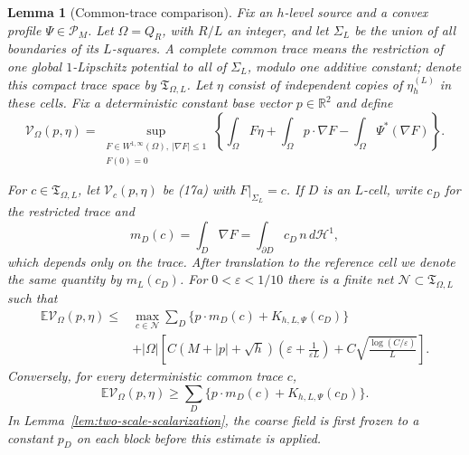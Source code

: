 \documentclass{aomart}
\newtheorem{lemma}[theorem]{Lemma}
\theoremstyle{definition}
\newcommand{\1}{\mathbf 1}
\begin{document}
\begin{lemma}[Common-trace comparison]\label{lem:finite-trace-net}
Fix an $h$-level source and a convex profile $\Psi\in\mathscr P_ M$.
Let $\Omega=Q_ R$, with $R/L$ an integer, and let $\Sigma_ L$ be
the union of all boundaries of its $L$-squares.  A complete common
trace means the restriction of one global $1$-Lipschitz potential to
all of $\Sigma_ L$, modulo one additive constant; denote this compact
trace space by $\mathfrak T_ {\Omega,L}$.  Let $\eta$ consist of independent
copies of $\eta_h^{(L)}$ in these cells.  Fix a deterministic constant
base vector $p\in\mathbb R^2$ and define
\begin{equation}
\mathcal V_ {\Omega}(p,\eta)=
\sup_ {\substack{F\in W^{1,\infty}(\Omega),\ |\nabla F|\leq1\\F(0)=0}}
\left\{\int_ \Omega F\eta+\int_ \Omega p\cdot\nabla F
-\int_ \Omega\Psi^*(\nabla F)\right\}.
\tag{17a}
\end{equation}

For $c\in\mathfrak T_ {\Omega,L}$, let
$\mathcal V_ c(p,\eta)$ be (17a) with $F|_ {\Sigma_ L}=c$.
If $D$ is an $L$-cell, write $c_ D$ for
the restricted trace and
\begin{equation}
m_ D(c)=\int_ D\nabla F
=\int_ {\partial D}c_ D\,n\,d\mathcal H^1,
\tag{17b}
\end{equation}
which depends only on the trace.  After translation to the reference
cell we denote the same quantity by $m_ L(c_ D)$.  For
$0<\varepsilon<1/10$ there is
a finite net $\mathcal N\subset\mathfrak T_ {\Omega,L}$ such that
\begin{equation}
\begin{split}
\mathbb E\mathcal V_ \Omega(p,\eta)
\leq{}&\max_ {c\in\mathcal N}
\sum_ D\{p\cdot m_ D(c)+K_ {h,L,\Psi}(c_ D)\}\\
&+|\Omega|\left[
C(M+|p|+\sqrt h)\left(\varepsilon+\frac1{\varepsilon L}\right)
+C\sqrt{\frac{\log(C/\varepsilon)}L}\right].                   
\end{split}
\tag{17}
\end{equation}
Conversely, for every deterministic common trace $c$,
\begin{equation}
\mathbb E\mathcal V_ \Omega(p,\eta)
\geq\sum_ D\{p\cdot m_ D(c)+K_ {h,L,\Psi}(c_ D)\}.
\tag{17c}
\end{equation}
In Lemma~\ref{lem:two-scale-scalarization}, the coarse field is first
frozen to a constant $p_D$ on each block before this estimate is applied.


\end{lemma}
\end{document}
